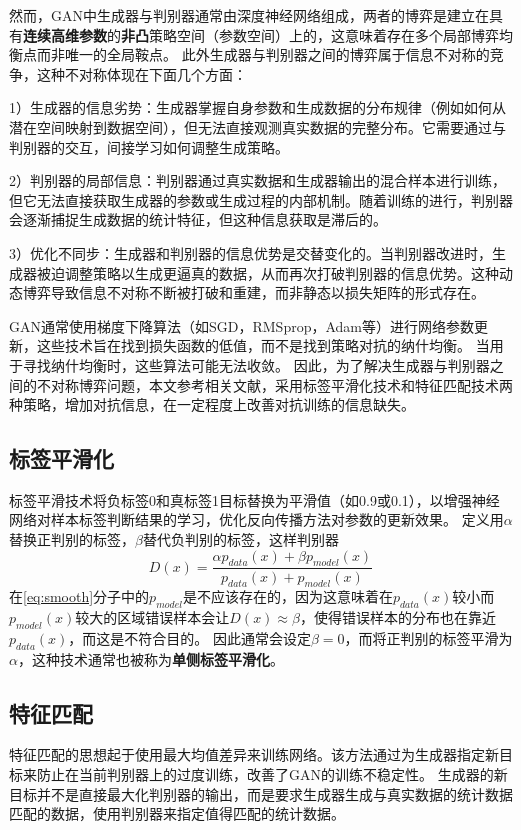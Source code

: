 然而，GAN中生成器与判别器通常由深度神经网络组成，两者的博弈是建立在具有\textbf{连续高维参数}的\textbf{非凸}策略空间（参数空间）上的，这意味着存在多个局部博弈均衡点而非唯一的全局鞍点。
此外生成器与判别器之间的博弈属于信息不对称的竞争，这种不对称体现在下面几个方面：

1）生成器的信息劣势：生成器掌握自身参数和生成数据的分布规律（例如如何从潜在空间映射到数据空间），但无法直接观测真实数据的完整分布。它需要通过与判别器的交互，间接学习如何调整生成策略。

2）判别器的局部信息：判别器通过真实数据和生成器输出的混合样本进行训练，但它无法直接获取生成器的参数或生成过程的内部机制。随着训练的进行，判别器会逐渐捕捉生成数据的统计特征，但这种信息获取是滞后的。

3）优化不同步：生成器和判别器的信息优势是交替变化的。当判别器改进时，生成器被迫调整策略以生成更逼真的数据，从而再次打破判别器的信息优势。这种动态博弈导致信息不对称不断被打破和重建，而非静态以损失矩阵的形式存在。

GAN通常使用梯度下降算法（如SGD，RMSprop，Adam等）进行网络参数更新，这些技术旨在找到损失函数的低值，而不是找到策略对抗的纳什均衡。
当用于寻找纳什均衡时，这些算法可能无法收敛\cite{goodfellow2014generative}。
因此，为了解决生成器与判别器之间的不对称博弈问题，本文参考相关文献\cite{salimans2016improved}，采用标签平滑化技术和特征匹配技术两种策略，增加对抗信息，在一定程度上改善对抗训练的信息缺失。

\subsection{标签平滑化}
标签平滑技术\cite{szegedy2016rethinking}\cite{10323353}将负标签0和真标签1目标替换为平滑值（如0.9或0.1），以增强神经网络对样本标签判断结果的学习，优化反向传播方法对参数的更新效果。
定义用$\alpha$替换正判别的标签，$\beta$替代负判别的标签，这样判别器
\begin{equation}
    \label{eq:smooth}
    D(x)=\frac{\alpha p_{data}(x)+\beta p_{model}(x)}{p_{data}(x)+p_{model}(x)}
\end{equation}
在\autoref{eq:smooth}分子中的$p_{model}$是不应该存在的，因为这意味着在$p_{data}(x)$较小而$p_{model}(x)$较大的区域错误样本会让$D(x)\approx\beta$，使得错误样本的分布也在靠近$p_{data}(x)$，而这是不符合目的。
因此通常会设定$\beta=0$，而将正判别的标签平滑为$\alpha$，这种技术通常也被称为\textbf{单侧标签平滑化}。

\subsection{特征匹配}
特征匹配的思想起于使用最大均值差异来训练网络\cite{dziugaite2015training}\cite{li2015generative}。该方法通过为生成器指定新目标来防止在当前判别器上的过度训练，改善了GAN的训练不稳定性。
生成器的新目标并不是直接最大化判别器的输出，而是要求生成器生成与真实数据的统计数据匹配的数据，使用判别器来指定值得匹配的统计数据。

